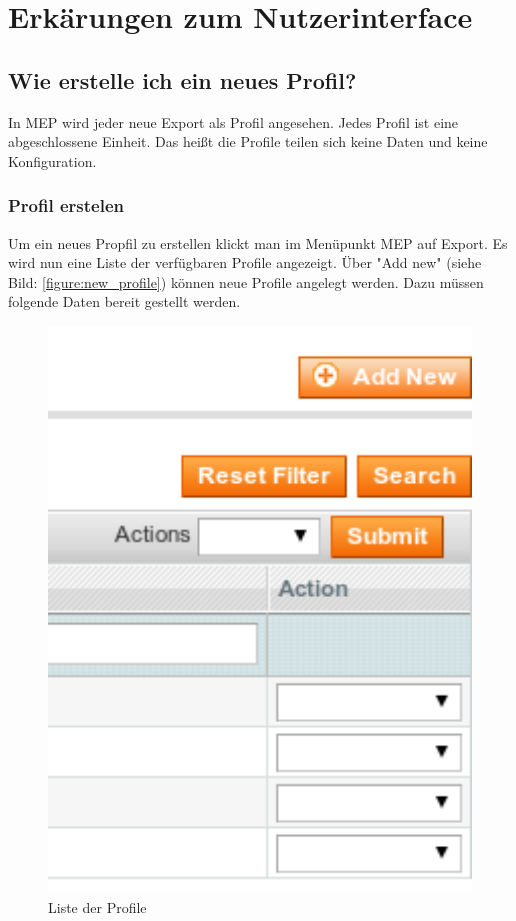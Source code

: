 \documentclass[a4paper,12pt]{book}
\begin{document}
\chapter{Erkärungen zum Nutzerinterface}
\section{Wie erstelle ich ein neues Profil?}
In MEP wird jeder neue Export als Profil angesehen. Jedes Profil ist
eine abgeschlossene Einheit. Das heißt die Profile teilen sich keine
Daten und keine Konfiguration.

\subsection{Profil erstelen}
Um ein neues Propfil zu erstellen klickt man im Menüpunkt MEP auf
Export. Es wird nun eine Liste der verfügbaren
Profile angezeigt. Über "Add new" (siehe Bild: \ref{figure:new_profile}) 
können neue Profile angelegt werden. Dazu müssen folgende Daten 
bereit gestellt werden.

\begin{figure}
 \includegraphics[width=1\textwidth]{img/bild02.png}
  \caption{Liste der Profile}
  \label{figure:profile_list}
\end{figure}
\end{document}
